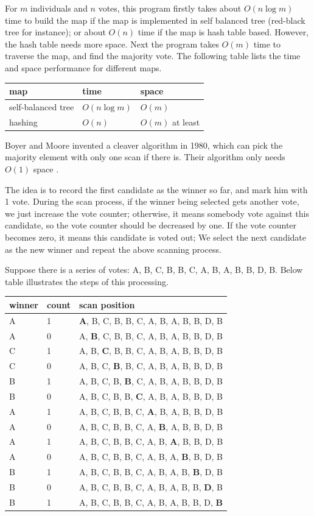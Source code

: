 \documentclass[UTF8]{article}
\begin{document}
For $m$ individuals and $n$ votes, this program firstly takes about $O(n \log m)$ time to build the map if
the map is implemented in self balanced tree (red-black tree for instance); or about $O(n)$ time if
the map is hash table based. However, the hash table needs more space. Next the program
takes $O(m)$ time to traverse the map, and find the majority vote. The following table lists the
time and space performance for different maps.

\begin{tabular}{|l|l|l|}
\hline
map & time & space \\
\hline
self-balanced tree & $O(n \log m)$ & $O(m)$ \\
hashing & $O(n)$ & $O(m)$ at least \\
\hline
\end{tabular}

Boyer and Moore invented a cleaver algorithm in 1980, which can pick the majority element with only
one scan if there is. Their algorithm only needs $O(1)$ space \cite{boyer-moore-majority}.

The idea is to record the first candidate as the winner so far, and mark him with 1 vote. During
the scan process, if the winner being selected gets another vote, we just increase the vote counter;
otherwise, it means somebody vote against this candidate, so the vote counter should be decreased
by one. If the vote counter becomes zero, it means this candidate is voted out; We select
the next candidate as the new winner and repeat the above scanning process.

Suppose there is a series of votes: A, B, C, B, B, C, A, B, A, B, B, D, B.
Below table illustrates the steps of this processing.

\begin{tabular}{|l|l|l|}
\hline
winner & count & scan position \\
\hline
A & 1 & {\bf A}, B, C, B, B, C, A, B, A, B, B, D, B \\
A & 0 & A, {\bf B}, C, B, B, C, A, B, A, B, B, D, B \\
C & 1 & A, B, {\bf C}, B, B, C, A, B, A, B, B, D, B \\
C & 0 & A, B, C, {\bf B}, B, C, A, B, A, B, B, D, B \\
B & 1 & A, B, C, B, {\bf B}, C, A, B, A, B, B, D, B \\
B & 0 & A, B, C, B, B, {\bf C}, A, B, A, B, B, D, B \\
A & 1 & A, B, C, B, B, C, {\bf A}, B, A, B, B, D, B \\
A & 0 & A, B, C, B, B, C, A, {\bf B}, A, B, B, D, B \\
A & 1 & A, B, C, B, B, C, A, B, {\bf A}, B, B, D, B \\
A & 0 & A, B, C, B, B, C, A, B, A, {\bf B}, B, D, B \\
B & 1 & A, B, C, B, B, C, A, B, A, B, {\bf B}, D, B \\
B & 0 & A, B, C, B, B, C, A, B, A, B, B, {\bf D}, B \\
B & 1 & A, B, C, B, B, C, A, B, A, B, B, D, {\bf B} \\
\hline
\end{tabular}
\end{document}
